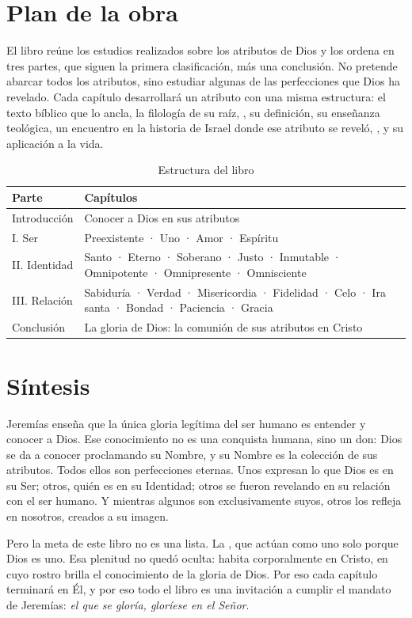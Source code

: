 \section{Plan de la obra}

El libro reúne los estudios realizados sobre los atributos de Dios y los ordena en tres partes, que siguen la primera clasificación, más una conclusión. No pretende abarcar todos los atributos, sino estudiar algunas de las perfecciones que Dios ha revelado. Cada capítulo desarrollará un atributo con una misma estructura: el texto bíblico que lo ancla, la filología de su raíz, , su definición, su enseñanza teológica, un encuentro en la historia de Israel donde ese atributo se reveló, , y su aplicación a la vida.

\begin{table}[htbp]
\centering\small
\caption{Estructura del libro}\label{tab:plan}
\renewcommand{\arraystretch}{1.3}
\begin{tabular}{@{}P{3.4cm} P{12.2cm}@{}}
\toprule
\textbf{Parte} & \textbf{Capítulos} \\ \midrule
Introducción & Conocer a Dios en sus atributos \\
I. Ser & Preexistente · Uno · Amor · Espíritu \\
II. Identidad & Santo · Eterno · Soberano · Justo · Inmutable · Omnipotente · Omnipresente · Omnisciente \\
III. Relación & Sabiduría · Verdad · Misericordia · Fidelidad · Celo · Ira santa · Bondad · Paciencia · Gracia \\
Conclusión & La gloria de Dios: la comunión de sus atributos en Cristo \\ \bottomrule
\end{tabular}
\end{table}

\section{Síntesis}

Jeremías enseña que la única gloria legítima del ser humano es entender y conocer a Dios. Ese conocimiento no es una conquista humana, sino un don: Dios se da a conocer proclamando su Nombre, y su Nombre es la colección de sus atributos. Todos ellos son perfecciones eternas. Unos expresan lo que Dios es en su Ser; otros, quién es en su Identidad; otros se fueron revelando en su relación con el ser humano. Y mientras algunos son exclusivamente suyos, otros los refleja en nosotros, creados a su imagen.

Pero la meta de este libro no es una lista. La , que actúan como uno solo porque Dios es uno. Esa plenitud no quedó oculta: habita corporalmente en Cristo, en cuyo rostro brilla el conocimiento de la gloria de Dios. Por eso cada capítulo terminará en Él, y por eso todo el libro es una invitación a cumplir el mandato de Jeremías: \emph{el que se gloría, gloríese en el Señor}.
